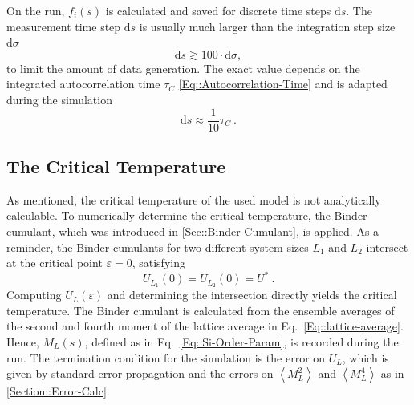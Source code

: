 	 On the run, $f_i(s)$ is calculated and saved for discrete time steps $\text{d}s$. The measurement time step $\text{d}s$ is usually much larger than the integration step size $\text{d}\sigma$
	 \begin{equation}
	 	\text{d}s \gtrsim 100 \cdot \text{d}\sigma,
	 \end{equation}
	 to limit the amount of data generation. The exact value depends on the integrated autocorrelation time $\tau_C$ \eqref{Eq::Autocorrelation-Time} and is adapted during the simulation
	 \begin{equation}
	 	 \text{d}s \approx \frac{1}{10} \tau_C~.
	 \end{equation}
	\subsection{The Critical Temperature} \label{Section::crit-temp}
		As mentioned, the critical temperature of the used model is not analytically calculable. To numerically determine the critical temperature, the Binder cumulant, which was introduced in \autoref{Sec::Binder-Cumulant}, is applied. As a reminder, the Binder cumulants for two different system sizes $L_1$ and $L_2$ intersect at the critical point $\varepsilon = 0$, satisfying
		\begin{equation}
			U_{L_1} (0) =	U_{L_2} (0) =	U^*~.
		\end{equation}
		Computing $U_{L}(\varepsilon)$ and determining the intersection directly yields the critical temperature. The Binder cumulant is calculated from the ensemble averages of the second and fourth moment of the lattice average in Eq.~\eqref{Eq::lattice-average}. Hence, $M_L(s)$, defined as in Eq.~\eqref{Eq::Si-Order-Param}, is recorded during the run. The termination condition for the simulation is the error on $U_L$, which is given by standard error propagation and the errors on $\left \langle M_L^2 \right \rangle$ and $\left \langle M_L^4 \right \rangle$ as in \autoref{Section::Error-Calc}. \\
